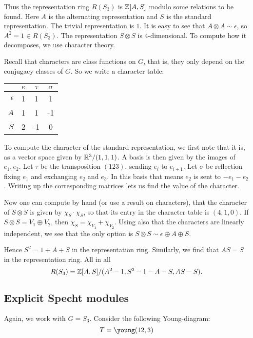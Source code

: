 \documentclass[11pt, english]{article}
\begin{document}
Thus the representation ring $R(S_3)$ is $\mathbb{Z}[A,S]$ modulo some relations to be found. Here $A$ is the alternating representation and $S$ is the standard representation. The trivial representation is $1$. It is easy to see that $A \otimes A \sim \epsilon$, so $A^2=1 \in R(S_3)$. The representation $S \otimes S$ is $4$-dimensional. To compute how it decomposes, we use character theory.

Recall that characters are class functions on $G$, that is, they only depend on the conjugacy classes of $G$. So we write a character table:

\begin{center}
\begin{tabular}{ r | c c  c }
 & $e$ & $\tau$ & $\sigma$ \\
\hline
$\epsilon$ & 1 & 1 & 1  \\
$A$ & 1 & 1 & -1 \\
$S$ & 2 & -1 & 0 \\
\end{tabular}
\end{center}

To compute the character of the standard representation, we first note that it is, as a vector space given by $\mathbb{R}^3/(1,1,1)$. A basis is then given by the images of $e_1,e_2$. Let $\tau$ be the transposition $(123)$, sending $e_i$ to $e_{i+1}$. Let $\sigma$ be reflection fixing $e_1$ and exchanging $e_2$ and $e_3$. In this basis that means $e_2$ is sent to $-e_1-e_2$. Writing up the corresponding matrices lets us find the value of the character.

Now one can compute by hand (or use a result on characters), that the character of $S \otimes S$ is given by $\chi_S \cdot \chi_S$, so that its entry in the character table is $(4,1,0)$. If $S \otimes S = V_1 \oplus V_2$, then $\chi_S = \chi_{V_1} + \chi_{V_2}$. Using also that the characters are linearly independent, we see that the only option is $S \otimes S \sim \epsilon \oplus A \oplus S$.

Hence $S^2=1+A+S$ in the representation ring. Similarly, we find that $AS=S$ in the representation ring. All in all
$$
R(S_3) = \mathbb{Z}[A,S]/(A^2-1,S^2-1-A-S,AS-S).
$$

\subsection{Explicit Specht modules}

Again, we work with $G=S_3$. Consider the following Young-diagram:
$$
T = \young(12,3)
$$
\end{document}
